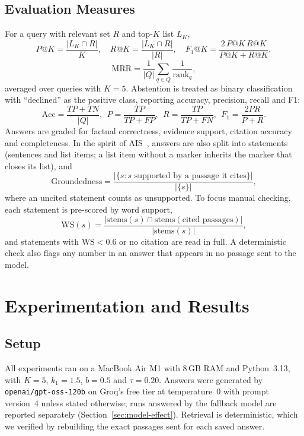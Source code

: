 \documentclass[conference]{IEEEtran}
\newcommand{\code}[1]{\texttt{#1}}
\begin{document}
\subsection{Evaluation Measures}
For a query with relevant set $R$ and top-$K$ list $L_K$,
\begin{equation}
P@K=\frac{|L_K\cap R|}{K},\quad R@K=\frac{|L_K\cap R|}{|R|},\quad F_1@K=\frac{2\,P@K\,R@K}{P@K+R@K}, \label{eq:prf}
\end{equation}
\begin{equation}
\mathrm{MRR}=\frac{1}{|Q|}\sum_{q\in Q}\frac{1}{\mathrm{rank}_q}, \label{eq:mrr}
\end{equation}
averaged over queries with $K=5$. Abstention is treated as binary classification with ``declined'' as the positive class, reporting accuracy, precision, recall and F1:
\begin{equation}
\mathrm{Acc}=\frac{TP+TN}{|Q|},\ \ P=\frac{TP}{TP+FP},\ \ R=\frac{TP}{TP+FN},\ \ F_1=\frac{2PR}{P+R}. \label{eq:cls}
\end{equation}
Answers are graded for factual correctness, evidence support, citation accuracy and completeness. In the spirit of AIS~\cite{rashkin2023ais}, answers are also split into statements (sentences and list items; a list item without a marker inherits the marker that closes its list), and
\begin{equation}
\mathrm{Groundedness}=\frac{|\{s: s \text{ supported by a passage it cites}\}|}{|\{s\}|}, \label{eq:ground}
\end{equation}
where an uncited statement counts as unsupported. To focus manual checking, each statement is pre-scored by word support,
\begin{equation}
\mathrm{WS}(s)=\frac{|\mathrm{stems}(s)\cap\mathrm{stems}(\text{cited passages})|}{|\mathrm{stems}(s)|}, \label{eq:ws}
\end{equation}
and statements with $\mathrm{WS}<0.6$ or no citation are read in full. A deterministic check also flags any number in an answer that appears in no passage sent to the model.

\section{Experimentation and Results}\label{sec:results}

\subsection{Setup}
All experiments ran on a MacBook Air M1 with 8\,GB RAM and Python~3.13, with $K=5$, $k_1=1.5$, $b=0.5$ and $\tau=0.20$. Answers were generated by \code{openai/gpt-oss-120b} on Groq's free tier at temperature~0 with prompt version~4 unless stated otherwise; runs answered by the fallback model are reported separately (Section~\ref{sec:model-effect}). Retrieval is deterministic, which we verified by rebuilding the exact passages sent for each saved answer.
\end{document}
